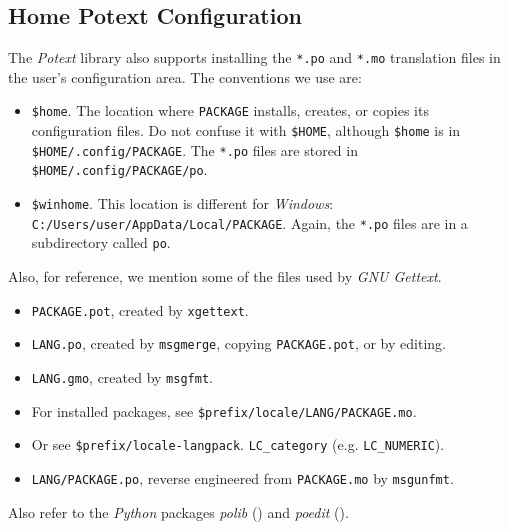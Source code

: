 \documentclass[
 11pt,
 twoside,
 a4paper,
 final                                 %
]{article}
\begin{document}
\subsection{Home Potext Configuration}
\label{subsec:introduction_home_potext_configuration}

   The \textsl{Potext} library also supports installing the
   \texttt{*.po} and \texttt{*.mo} translation files in the
   user's configuration area.
   The conventions we use are:

   \begin{itemize}
      \item \texttt{\$home}. The location where \texttt{PACKAGE} installs,
         creates, or copies its configuration files.
         Do not confuse it with \texttt{\$HOME},
         although \texttt{\$home} is in
         \texttt{\$HOME/.config/PACKAGE}.
         The \texttt{*.po} files are stored in
         \texttt{\$HOME/.config/PACKAGE/po}.
      \item \texttt{\$winhome}. This location is different for
         \textsl{Windows}:
         \texttt{C:/Users/user/AppData/Local/PACKAGE}.
         Again, the \texttt{*.po} files are in a
         subdirectory called \texttt{po}.
   \end{itemize}

   Also, for reference, we mention some of the files used by
   \textsl{GNU Gettext}.

   \begin{itemize}
      \item \texttt{PACKAGE.pot}, created by \texttt{xgettext}.
      \item \texttt{LANG.po}, created by \texttt{msgmerge},
         copying \texttt{PACKAGE.pot}, or by editing.
      \item \texttt{LANG.gmo}, created by \texttt{msgfmt}.
      \item For installed packages, see
         \texttt{\$prefix/locale/LANG/PACKAGE.mo}.
      \item Or see
         \texttt{\$prefix/locale-langpack}.
         \texttt{LC\_category} (e.g. \texttt{LC\_NUMERIC}).
      \item \texttt{LANG/PACKAGE.po}, reverse engineered from
         \texttt{PACKAGE.mo} by \texttt{msgunfmt}.
   \end{itemize}

   Also refer to the \textsl{Python} packages \textsl{polib} (\cite{polib})
   and \textsl{poedit} (\cite{poedit}).

\end{document}
